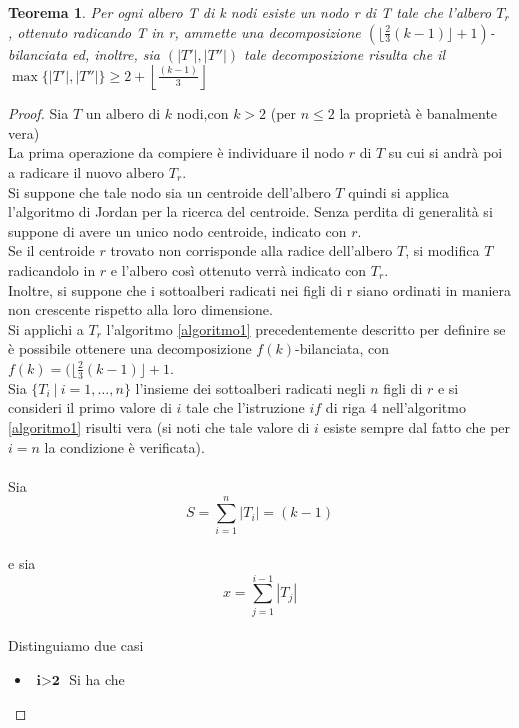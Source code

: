 \newtheorem{teorema1}[definizione]{Teorema}
\begin{teorema1}
	\label{teorema1 cap3 sez1}
Per ogni albero T di k nodi esiste un nodo r di T  tale che l'albero $T_r$, ottenuto radicando T in r, ammette una decomposizione $ (\lfloor \frac{2}{3}(k-1) \rfloor + 1)$-bilanciata ed, inoltre, sia $ (|T'|,|T''|)$ tale decomposizione risulta che il $ \max \{|T'|,|T''|\} \ge 2+ \left\lfloor \frac{(k-1)}{3}\right\rfloor $
\end{teorema1}\mbox{}
\begin{proof}
	
	Sia $ T $ un albero di $ k $ nodi,con $ k>2 $ (per $n\le2$ la propriet\`a \`e banalmente vera) \\
	La prima operazione da compiere \`e individuare il nodo $ r $ di $ T $ su cui si andr\`a poi a radicare il nuovo albero $ T_r $.\\
	Si suppone che tale nodo sia un centroide dell'albero $ T $ quindi si applica l'algoritmo di Jordan per la ricerca del centroide. Senza perdita di generalit\`a si suppone di avere un unico nodo centroide, indicato con $ r $.\\
	Se il centroide $ r $ trovato non corrisponde alla radice dell'albero $ T $, si modifica $ T $ radicandolo in $ r $ e l'albero cos\`i ottenuto verr\`a indicato con $ T_r $. \\ 
	Inoltre, si suppone che i sottoalberi radicati nei figli di r siano ordinati in maniera non crescente rispetto alla loro dimensione.\\
	Si applichi a $ T_r $ l'algoritmo \ref{algoritmo1} precedentemente descritto per definire se \`e possibile ottenere una decomposizione $ f(k) $-bilanciata, con $ f(k) =
	(\lfloor \frac{2}{3}(k-1) \rfloor + 1  $.\\
	Sia $ \{T_i \ | \  i=1,\dots,n\} $ l'insieme dei sottoalberi radicati negli $ n $ figli di $ r $ e si consideri il primo valore di $ i $ tale che l'istruzione $ if $ di riga $ 4 $ nell'algoritmo \ref{algoritmo1} risulti vera (si noti che tale valore di $ i $ esiste sempre dal fatto che per $ i = n $ la condizione \`e verificata).\mbox{}\\\\
	Sia 
	\[ S = \sum_{i=1}^{n}{|T_i|} = (k-1 ) \]\\
	e sia
	\[ x = \sum_{j=1}^{i-1}{|T_j|} \]\\
	Distinguiamo due casi
	\begin{itemize}
	\item $\textbf{ i>2 }$ Si ha che
	\\ 

\end{itemize}
\end{proof}
